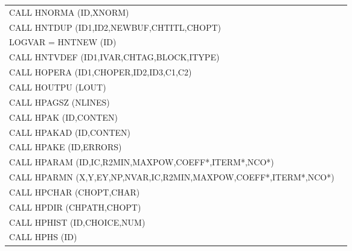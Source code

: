 \begin{longtable}{|>{\ttfamily\small}p{.9\linewidth}r|}
CALL     HNORMA (ID,XNORM)                   
&                                                       \pageref{HNORMA} \\
CALL     HNTDUP (ID1,ID2,NEWBUF,CHTITL,CHOPT)
&                                                       \pageref{HNTDUP} \\
LOGVAR = HNTNEW (ID)                         
&                                                       \pageref{HNTNEW} \\
CALL     HNTVDEF (ID1,IVAR,CHTAG,BLOCK,ITYPE)
&                                                       \pageref{HNTVDEF}\\
CALL     HOPERA (ID1,CHOPER,ID2,ID3,C1,C2)   
&                                                       \pageref{HOPERA} \\
CALL     HOUTPU (LOUT)                       
&                                                       \pageref{HOUTPU} \\
CALL     HPAGSZ (NLINES)                     
&                                                       \pageref{HPAGSZ} \\
CALL     HPAK   (ID,CONTEN)                  
&                                                       \pageref{HPAK}   \\
CALL     HPAKAD (ID,CONTEN)                  
&                                                       \pageref{HPAKAD} \\
CALL     HPAKE  (ID,ERRORS)                  
&                                                       \pageref{HPAKE}  \\
CALL     HPARAM (ID,IC,R2MIN,MAXPOW,COEFF*,ITERM*,NCO*)
&                                                       \pageref{HPARAM} \\
CALL     HPARMN (X,Y,EY,NP,NVAR,IC,R2MIN,MAXPOW,COEFF*,ITERM*,NCO*)
&                                                       \pageref{HPARMN} \\
CALL     HPCHAR (CHOPT,CHAR)                 
&                                                       \pageref{HPCHAR} \\
CALL     HPDIR  (CHPATH,CHOPT)               
&                                                       \pageref{HPDIR}  \\
CALL     HPHIST (ID,CHOICE,NUM)              
&                                                       \pageref{HPHIST} \\
CALL     HPHS   (ID)                         
&                                                       \pageref{HPHS}   \\

\end{longtable}

